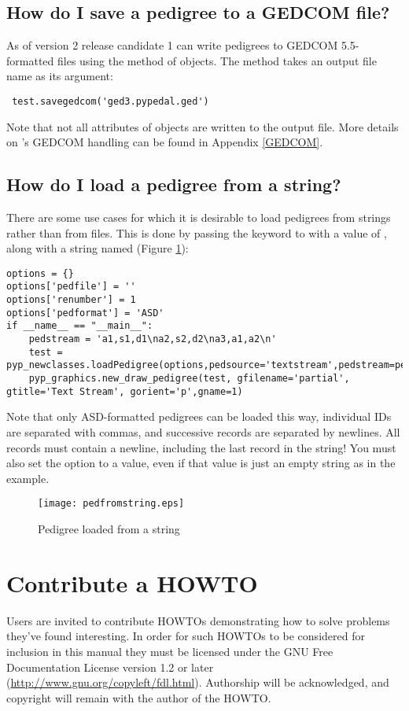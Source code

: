 \subsection{How do I save a pedigree to a GEDCOM file?}
\label{sec:howto-save-gedcom-pedigree}
As of version 2 release candidate 1 \PyPedal{} can write pedigrees to GEDCOM 5.5-formatted files using the  method of  objects. The method takes an output file name as its argument:
\begin{verbatim}
 test.savegedcom('ged3.pypedal.ged')
\end{verbatim}
Note that not all attributes of  objects are written to the output file. More details on \PyPedal{}'s GEDCOM handling can be found in Appendix \ref{GEDCOM}.
\subsection{How do I load a pedigree from a string?}
\label{sec:howto-load-from-string}
There are some use cases for which it is desirable to load pedigrees from strings rather than from files. This is done by passing the  keyword to  with a value of , along with a string named  (Figure \ref{fig:ped-from-string}):
\begin{verbatim}
options = {}
options['pedfile'] = ''
options['renumber'] = 1
options['pedformat'] = 'ASD'
if __name__ == "__main__":
    pedstream = 'a1,s1,d1\na2,s2,d2\na3,a1,a2\n'
    test = pyp_newclasses.loadPedigree(options,pedsource='textstream',pedstream=pedstream)
    pyp_graphics.new_draw_pedigree(test, gfilename='partial', gtitle='Text Stream', gorient='p',gname=1)
\end{verbatim}
Note that only ASD-formatted pedigrees can be loaded this way, individual IDs are separated with commas, and successive records are separated by newlines. All records must contain a newline, including the last record in the string! You must also set the  option to a value, even if that value is just an empty string as in the example.
\begin{figure}
  \begin{center}
    \texttt{[image: pedfromstring.eps]}
    \caption{Pedigree loaded from a string}
    \label{fig:ped-from-string}
  \end{center}
\end{figure}
\section{Contribute a HOWTO}
\label{sec:howto-contribute}
Users are invited to contribute HOWTOs demonstrating how to solve problems they've found interesting.  In order for such HOWTOs to be considered for inclusion in this manual they must be licensed under the GNU Free Documentation License version 1.2 or later (\url{http://www.gnu.org/copyleft/fdl.html}).  Authorship will be acknowledged, and copyright will remain with the author of the HOWTO.
